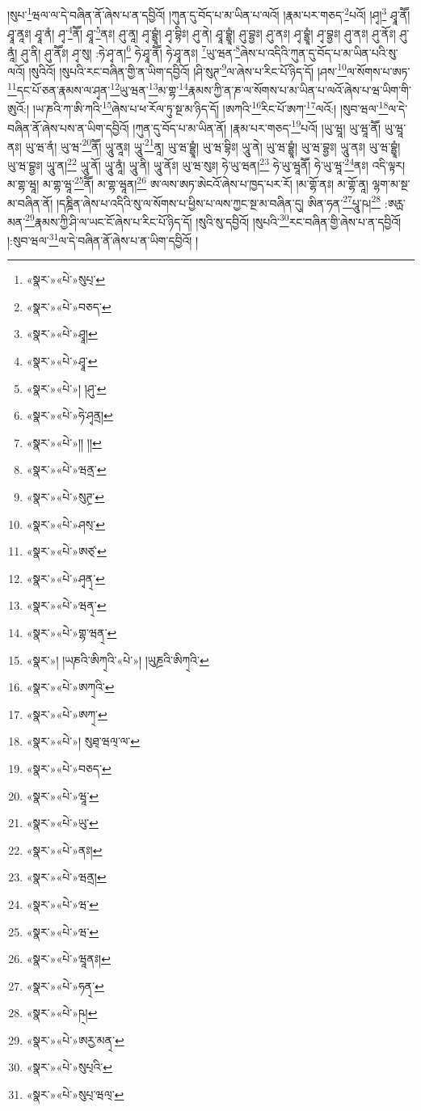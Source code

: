 །སུཔ་\footnote{«སྣར་»«པེ་»སུཔ྄་}ཝལ་ལ་དེ་བཞིན་ནོ་ཞེས་པ་ན་དབྱིའོ། །ཀུན་དུ་བོད་པ་མ་ཡིན་པ་ལའོ། །རྣམ་པར་གཅད་\footnote{«སྣར་»«པེ་»བཅད་}པའོ། །ཤྭ།\footnote{«སྣར་»«པེ་»ཤྭཱ།} ཤྭཱ་ནཽ། ཤྭཱ་ནཱཿ། ཤྭཱ་ནཾ། ཤྭ་\footnote{«སྣར་»«པེ་»ཤྭཱ་}ནཽ། ཤྭཱ་\footnote{«སྣར་»«པེ་»། །ཤུ་}ནཿ། ཤུ་ནཱ། ཤྭ་བྷྱཱཾ། ཤྭ་བྷིཿ། ཤུ་ནེ། ཤྭཱ་བྷྱཱཾ། ཤུ་བྷྱཿ། ཤུ་ནཿ། ཤྭ་བྷྱཱཾ། ཤྭ་བྷྱཿ། ཤུ་ནཿ། ཤུ་ནོཿ། ཤུ་ནཱཾ། ཤུ་ནི། ཤུ་ནཽཿ། ཤྭ་སུ། :ཧེ་ཤྭ་ན།\footnote{«སྣར་»«པེ་»ཧེ་ཤྭནྲ།} ཧེ་ཤྭཱ་ནཽ། ཧེ་ཤྭཱ་ནཿ། \footnote{«སྣར་»«པེ་»།། །། }ཡུ་ཝན་\footnote{«སྣར་»«པེ་»ཝནྲ་}ཞེས་པ་འདིའི་ཀུན་དུ་བོད་པ་མ་ཡིན་པའི་སུ་ལའོ། །སུའིའོ། །སུཔའི་རང་བཞིན་གྱི་ན་ཡིག་དབྱིའོ། །ཤི་སུཊ་\footnote{«སྣར་»«པེ་»སུཊྲ་}ལ་ཞེས་པ་རིང་པོ་ཉིད་དོ། །ཤས་\footnote{«སྣར་»«པེ་»ཤས྄་}ལ་སོགས་པ་ཨཏ་\footnote{«སྣར་»«པེ་»ཨཙ྄་}དང་པོ་ཅན་རྣམས་ལ་ཤྭན་\footnote{«སྣར་»«པེ་»ཤྭན྄་}ཡུ་ཝན་\footnote{«སྣར་»«པེ་»ཝན྄་}མ་གྷ་\footnote{«སྣར་»«པེ་»གྷ་ཝན྄་}རྣམས་ཀྱི་ན་ཎ་ལ་སོགས་པ་མ་ཡིན་པ་ལའོ་ཞེས་པ་ཝ་ཡིག་གི་ཨུའོ:། །ཡ་ཎའི་ཀ་ཨི་ཀའི་\footnote{«སྣར་»། །ཡཎའི་ཨིཀ྄འི་«པེ་»། །ཡུཎྲའི་ཨིཀ྄འི་}ཞེས་པ་ཕ་རོལ་ཏུ་སྔ་མ་ཉིད་དོ། །ཨཀའི་\footnote{«སྣར་»«པེ་»ཨཀ྄འི་}རིང་པོ་ཨཀ་\footnote{«སྣར་»«པེ་»ཨཀ྄་}ལའོ:། །སུབ་ཝལ་\footnote{«སྣར་»«པེ་»། སུཐ྄་ཝལ྄་ལ་}ལ་དེ་བཞིན་ནོ་ཞེས་པས་ན་ཡིག་དབྱིའོ། །ཀུན་དུ་བོད་པ་མ་ཡིན་ནོ། །རྣམ་པར་གཅད་\footnote{«སྣར་»«པེ་»བཅད་}པའོ། །ཡུ་ཝཱ། ཡུ་ཝཱ་ནཽ། ཡུ་ཝཱ་ནཿ། ཡུ་ཝ་ནཾ། ཡུ་ཝ་\footnote{«སྣར་»«པེ་»ཝཱ་}ནཽ། ཡཱུ་ནཱཿ། ཡཱུ་\footnote{«སྣར་»«པེ་»ཡུ་}ནཱ། ཡུ་ཝ་བྷྱཱཾ། ཡུ་ཝ་བྷིཿ། ཡཱུ་ནེ། ཡུ་ཝ་བྷྱཱཾ། ཡུ་ཝ་བྷྱཿ། ཡཱུ་ནཿ། ཡུ་ཝ་བྷྱཱཾ། ཡུ་ཝ་བྷྱཿ། ཡཱུ་ན།\footnote{«སྣར་»«པེ་»ནཿ།} ཡཱུ་ནོ། ཡཱུ་ནཱཾ། ཡཱུ་ནི། ཡཱུ་ནོཿ། ཡུ་ཝ་སུཿ། ཧེ་ཡུ་ཝན།\footnote{«སྣར་»«པེ་»ཝནྲ།} ཧེ་ཡུ་ཝཱནཽ། ཧེ་ཡུ་ཝཱ་\footnote{«སྣར་»«པེ་»ཝ་}ནཿ། འདི་ལྟར། མ་གྷ་ཝཱ། མ་གྷ་ཝཱ་\footnote{«སྣར་»«པེ་»ཝ་}ནཽ། མ་གྷ་ཝཱན།\footnote{«སྣར་»«པེ་»ཝཱནཿ།} ཨ་ལས་ཨཏ་ཨེངའོ་ཞེས་པ་ཁྱད་པར་རོ། །མ་གྷོ་ནཿ། མ་གྷོ་ནཱ། ལྷག་མ་སྔ་མ་བཞིན་ནོ། །དཎྜིན་ཞེས་པ་འདིའི་སུ་ལ་སོགས་པ་ཕྱིས་པ་ལས་ཀྱང་སྔ་མ་བཞིན་དུ། ཨིན་ཧན་\footnote{«སྣར་»«པེ་»ཧན྄་}པཱུ་ཥ།\footnote{«སྣར་»«པེ་»ཥ྄།} :ཨཪྻ་མན་\footnote{«སྣར་»«པེ་»ཨརྱ་མན྄་}རྣམས་ཀྱི་ཤི་ལ་ཡང་ངོ་ཞེས་པ་རིང་པོ་ཉིད་དོ། །སུའི་སུ་དབྱིའོ། །སུཔའི་\footnote{«སྣར་»«པེ་»སུཔ྄འི་}རང་བཞིན་གྱི་ཞེས་པ་ན་དབྱིའོ། །:སུབ་ཝལ་\footnote{«སྣར་»«པེ་»སུཔ྄་ཝལ྄་}ལ་དེ་བཞིན་ནོ་ཞེས་པ་ན་ཡིག་དབྱིའོ། །
